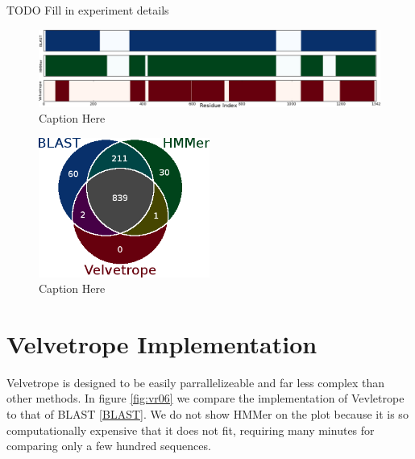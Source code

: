 \documentclass[phd,tocprelim]{cornell}
\begin{document}
TODO Fill in experiment details

\begin{figure}[htp]%
 \centerline{\includegraphics[width=\textwidth]{figures/velvetrope/compare6.png}}
 \caption[Velvetrope vs. HMMer and BLAST]{Caption Here}
 	\label{VRcompare1}
 \end{figure}

 \begin{figure}[htp]%
 \centerline{\includegraphics[width=0.5\textwidth]{figures/velvetrope/compare5.png}}
 \caption[Comparison Venn diagram]{Caption Here}
 	\label{VRcompare2}
 \end{figure}



\chapter{Velvetrope Implementation} %
\label{cha:Velvetrope Implementation}

Velvetrope is designed to be easily parrallelizeable and far less complex than other methods. In figure \ref{fig:vr06} we compare the implementation of Vevletrope to that of BLAST \ref{BLAST}. We do not show HMMer on the plot because it is so computationally expensive that it does not fit, requiring many minutes for comparing only a few hundred sequences.
\end{document}
